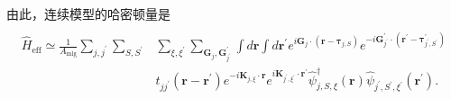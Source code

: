 \documentclass[10pt, oneside]{article}
\begin{document}
由此，连续模型的哈密顿量是
\begin{align}
	\boxed{
		\begin{aligned}
			\begin{split}
				\hat{H}_{\mathrm{eff}} \simeq \frac{1}{A_{\mathrm{mlg}}} \sum_{j,j^{\prime}} \sum_{S,S^{\prime}} &\sum_{\xi,\xi^{\prime}} \sum_{\bm{G}_{j}, \bm{G}^{\prime}_{j^{\prime}}} \int d \bm{r} \int d \bm{r}^{\prime} e^{i \bm{G}_{j} \cdot \left(\bm{r} - \bm{\tau}_{j,S}\right)} e^{-i \bm{G}^{\prime}_{j^{\prime}} \cdot \left(\bm{r}^{\prime} - \bm{\tau}^{\prime}_{j^{\prime}, S^{\prime}}\right)} \\
				& t_{jj^{\prime}} \left(\bm{r} - \bm{r}^{\prime}\right) e^{-i \bm{K}_{j, \xi} \cdot \bm{r}} e^{i \bm{K}_{j^{\prime}, \xi^{\prime}} \cdot \bm{r}^{\prime}} \hat{\psi}^{\dagger}_{j,S,\xi} \left(\bm{r}\right) \hat{\psi}_{j^{\prime}, S^{\prime}, \xi^{\prime}} \left(\bm{r}^{\prime}\right).
			\end{split}
		\end{aligned}
	}
\end{align}
\end{document}
